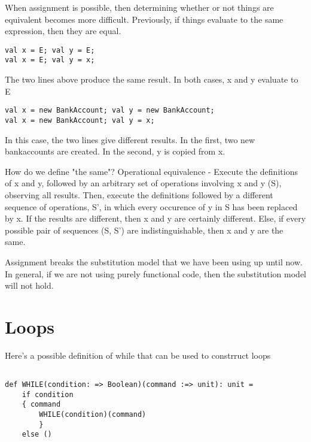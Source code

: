 When assignment is possible, then determining whether or not things are equivalent becomes more difficult. Previously, if things evaluate to the same expression, then they are equal. 

\begin{lstlisting}
val x = E; val y = E;
val x = E; val y = x;
\end{lstlisting}
The two lines above produce the same result. In both cases, x and y evaluate to E
\begin{lstlisting}
val x = new BankAccount; val y = new BankAccount;
val x = new BankAccount; val y = x;
\end{lstlisting}
In this case, the two lines give different results. In the first, two new bankaccounts are created. In the second, y is copied from x.

How do we define "the same"? Operational equivalence - Execute the definitions of x and y, followed by an arbitrary set of operations involving x and y (S), observing all results. Then, execute the definitions followed by a different sequence of operations, S', in which every occurence of y in S has been replaced by x. If the results are different, then x and y are certainly different. Else, if every possible pair of sequences (S, S') are indistinguishable, then x and y are the same.

Assignment breaks the substitution model that we have been using up until now. In general, if we are not using purely functional code, then the substitution model will not hold.

\section{Loops}

Here's a possible definition of while that can be used to constrruct loops
\begin{lstlisting}

def WHILE(condition: => Boolean)(command :=> unit): unit = 
	if condition
	{ command
		WHILE(condition)(command)
		}
	else ()
\end{lstlisting}

 
